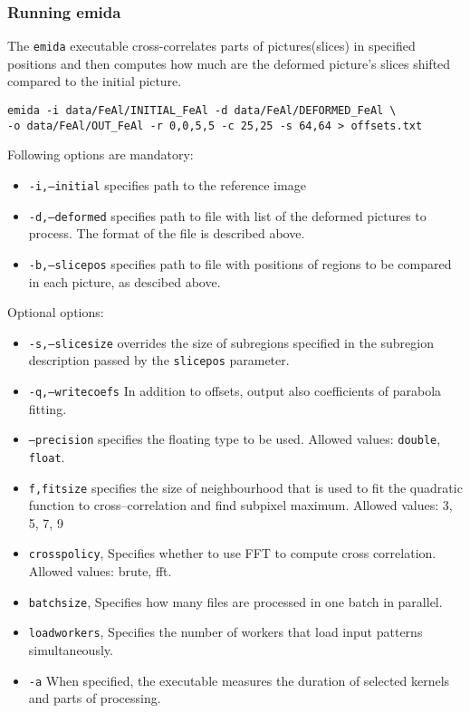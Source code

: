 \subsubsection*{Running emida}
The \texttt{emida} executable cross-correlates parts of pictures(slices) in specified positions and then computes how much are the deformed picture's slices shifted compared to the initial picture.
\begin{verbatim}
emida -i data/FeAl/INITIAL_FeAl -d data/FeAl/DEFORMED_FeAl \
-o data/FeAl/OUT_FeAl -r 0,0,5,5 -c 25,25 -s 64,64 > offsets.txt
\end{verbatim}
Following options are mandatory:
\begin{itemize}
	\item \texttt{-i,--initial} specifies path to the reference image
	\item \texttt{-d,--deformed} specifies path to file with list of the deformed pictures to process. The format of the file is described above.
	\item \texttt{-b,--slicepos} specifies path to file with positions of regions to be compared in each picture, as descibed above.
\end{itemize}
Optional options:
\begin{itemize}
	\item \texttt{-s,--slicesize} overrides the size of subregions specified in the subregion description passed by the \texttt{slicepos} parameter.
	\item \texttt{-q,--writecoefs} In addition to offsets, output also coefficients of parabola fitting.
	\item  \texttt{--precision} specifies the floating type to be used. Allowed values: \texttt{double}, \texttt{float}.
	\item \texttt{f,fitsize} specifies the size of neighbourhood that is used to fit the quadratic function to cross--correlation and find subpixel maximum. Allowed values: 3, 5, 7, 9
	\item \texttt{crosspolicy}, Specifies whether to use FFT to compute cross correlation. Allowed values: brute, fft.
	\item \texttt{batchsize}, Specifies how many files are processed in one batch in parallel.
	\item \texttt{loadworkers}, Specifies the number of workers that load input patterns simultaneously.
	\item \texttt{-a} When specified, the executable measures the duration of selected kernels and parts of processing.
\end{itemize}

